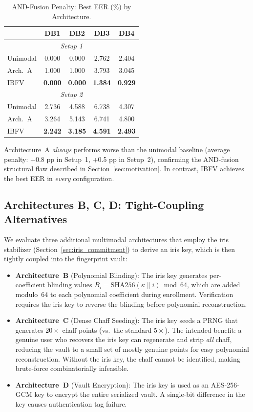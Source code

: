 \documentclass[conference]{IEEEtran}
\newcommand{\IBFV}{\textsf{IBFV}}
\begin{document}
\begin{table}[t]
\centering
\caption{AND-Fusion Penalty: Best EER (\%) by Architecture.}
\label{tab:arch_a_penalty}
\begin{tabular}{@{}l c c c c@{}}
\toprule
 & \textbf{DB1} & \textbf{DB2} & \textbf{DB3} & \textbf{DB4} \\
\midrule
\multicolumn{5}{c}{\textit{Setup 1}} \\
\midrule
Unimodal & 0.000 & 0.000 & 2.762 & 2.404 \\
Arch.~A  & 1.000 & 1.000 & 3.793 & 3.045 \\
\IBFV{}  & \textbf{0.000} & \textbf{0.000} & \textbf{1.384} & \textbf{0.929} \\
\midrule
\multicolumn{5}{c}{\textit{Setup 2}} \\
\midrule
Unimodal & 2.736 & 4.588 & 6.738 & 4.307 \\
Arch.~A  & 3.264 & 5.143 & 6.741 & 4.800 \\
\IBFV{}  & \textbf{2.242} & \textbf{3.185} & \textbf{4.591} & \textbf{2.493} \\
\bottomrule
\end{tabular}
\end{table}

Architecture~A \emph{always} performs worse than the unimodal baseline (average penalty: +0.8 pp in Setup~1, +0.5 pp in Setup~2), confirming the AND-fusion structural flaw described in Section~\ref{sec:motivation}. In contrast, \IBFV{} achieves the best EER in \emph{every} configuration.

\subsection{Architectures B, C, D: Tight-Coupling Alternatives}
\label{sec:arch_bcd_results}

We evaluate three additional multimodal architectures that employ the iris stabilizer (Section~\ref{sec:iris_commitment}) to derive an iris key, which is then tightly coupled into the fingerprint vault:

\begin{itemize}
    \item \textbf{Architecture~B} (Polynomial Blinding): The iris key generates per-coefficient blinding values $B_i = \text{SHA256}(\kappa \| i) \bmod 64$, which are added modulo~64 to each polynomial coefficient during enrollment. Verification requires the iris key to reverse the blinding before polynomial reconstruction.
    \item \textbf{Architecture~C} (Dense Chaff Seeding): The iris key seeds a PRNG that generates $20\times$ chaff points (vs.\ the standard $5\times$). The intended benefit: a genuine user who recovers the iris key can regenerate and strip \emph{all} chaff, reducing the vault to a small set of mostly genuine points for easy polynomial reconstruction. Without the iris key, the chaff cannot be identified, making brute-force combinatorially infeasible.
    \item \textbf{Architecture~D} (Vault Encryption): The iris key is used as an AES-256-GCM key to encrypt the entire serialized vault. A single-bit difference in the key causes authentication tag failure.
\end{itemize}
\end{document}
